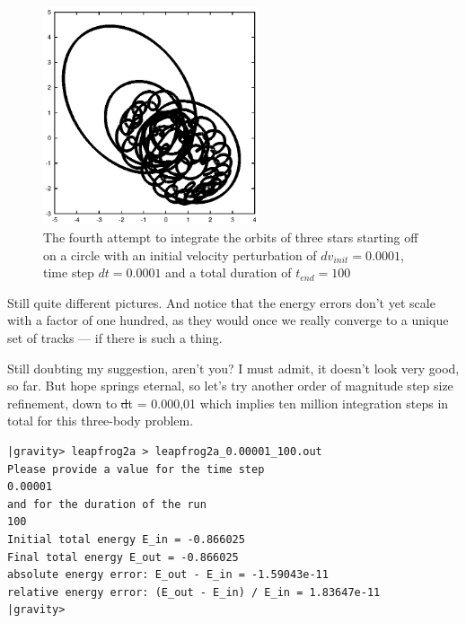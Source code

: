 \begin{figure}[htb]
\centering
\includegraphics[width=2.5in]{chap5/leapfrog2a_0.0001_100.ps}
\caption[Three stars on a circle, leapfrog, $dv_{init}=0.0001$, $dt = 0.0001$,
$t_{end} = 100$]
{The fourth attempt to integrate the orbits of three stars
starting off on a circle with an initial velocity perturbation of 
$dv_{init}=0.0001$, time step $dt = 0.0001$ and a total duration of
$t_{end} = 100$}
\label{fig:leap2a-0.0001-100}
\end{figure}

\abc

\bob
Still quite different pictures.  And notice that the energy errors
don't yet scale with a factor of one hundred, as they would once we
really converge to a unique set of tracks --- if there is such a thing.

\alice
Still doubting my suggestion, aren't you?  I must admit, it doesn't
look very good, so far.  But hope springs eternal, so let's try
another order of magnitude step size refinement, down to {\st dt =
0.000,01} which implies ten million integration steps in total for
this three-body problem.

\cba

\begin{small}
\begin{verbatim}
|gravity> leapfrog2a > leapfrog2a_0.00001_100.out
Please provide a value for the time step
0.00001
and for the duration of the run
100
Initial total energy E_in = -0.866025
Final total energy E_out = -0.866025
absolute energy error: E_out - E_in = -1.59043e-11
relative energy error: (E_out - E_in) / E_in = 1.83647e-11
|gravity>
\end{verbatim}
\end{small}

